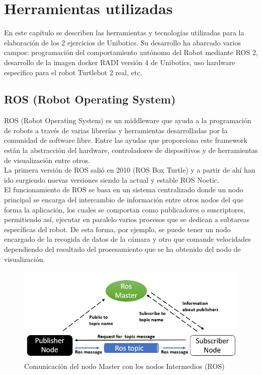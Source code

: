 \chapter{Herramientas utilizadas}
\label{cap:capitulo3}

En este capítulo se describen las herramientas y tecnologías utilizadas para la elaboración de los 2 ejercicios de Unibotics. Su desarrollo ha abarcado varios campos: programación del comportamiento autónomo del Robot mediante ROS 2, desarrollo de la imagen docker RADI versión 4 de Unibotics, uso hardware específico para el robot Turtlebot 2 real, etc.\\

\section{ROS (Robot Operating System)}
\label{sec:ros}
ROS (Robot Operating System) es un middleware que ayuda a la programación de robots a través de varias librerías y herramientas desarrolladas por la comunidad de software libre. Entre las ayudas que proporciona este framework están la abstracción del hardware, controladores de dispositivos y de herramientas de visualización entre otros.\\

La primera versión de ROS salió en 2010 (ROS Box Turtle) y a partir de ahí han ido surgiendo nuevas versiones siendo la actual y estable ROS Noetic.\\

El funcionamiento de ROS se basa en un sistema centralizado donde un nodo principal se encarga del intercambio de información entre otros nodos del que forma la aplicación, los cuales se comportan como publicadores o suscriptores, permitiendo así, ejecutar en paralelo varios procesos que se dedican a subtareas específicas del robot. De esta forma, por ejemplo, se puede tener un nodo encargado de la recogida de datos de la cámara y otro que comande velocidades dependiendo del resultado del procesamiento que se ha obtenido del nodo de visualización.\\

\begin{figure} [H]
  \begin{center}
    \includegraphics[width=15cm]{imagenes/ros_master_communication.png}
  \end{center}
  \caption{Comunicación del nodo Master con los nodos Intermedios (ROS)}
  \label{fig:ros_master_comunicación}
\end{figure}\

